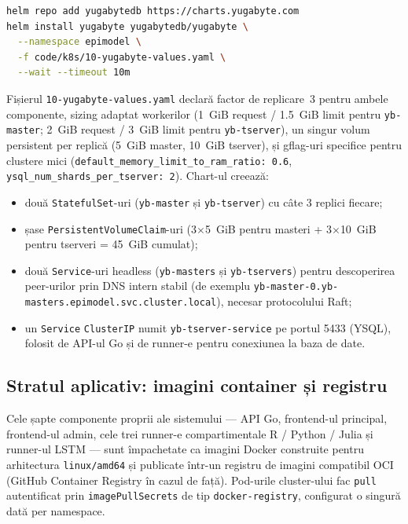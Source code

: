 \begin{lstlisting}[language=bash, caption={Instalarea YugabyteDB cu Helm și fișierul de \texttt{values} custom.}]
helm repo add yugabytedb https://charts.yugabyte.com
helm install yugabyte yugabytedb/yugabyte \
  --namespace epimodel \
  -f code/k8s/10-yugabyte-values.yaml \
  --wait --timeout 10m
\end{lstlisting}

Fișierul \texttt{10-yugabyte-values.yaml} declară factor de replicare~3
pentru ambele componente, sizing adaptat workerilor (1~GiB request /
1.5~GiB limit pentru \texttt{yb-master}; 2~GiB request / 3~GiB limit pentru
\texttt{yb-tserver}), un singur volum persistent per replică
(5~GiB master, 10~GiB tserver), și gflag-uri specifice pentru clustere
mici (\texttt{default\_memory\_limit\_to\_ram\_ratio: 0.6},
\texttt{ysql\_num\_shards\_per\_tserver: 2}). Chart-ul creează:

\begin{itemize}\itemsep0pt
    \item două \texttt{StatefulSet}-uri (\texttt{yb-master} și
          \texttt{yb-tserver}) cu câte 3 replici fiecare;
    \item șase \texttt{PersistentVolumeClaim}-uri (3$\times$5~GiB pentru
          masteri + 3$\times$10~GiB pentru tserveri = 45~GiB cumulat);
    \item două \texttt{Service}-uri headless (\texttt{yb-masters} și
          \texttt{yb-tservers}) pentru descoperirea peer-urilor prin DNS
          intern stabil (de exemplu
          \texttt{yb-master-0.yb-masters.\allowbreak epimodel.svc.cluster.local}),
          necesar protocolului Raft;
    \item un \texttt{Service} \texttt{ClusterIP} numit
          \texttt{yb-tserver-service} pe portul 5433 (YSQL), folosit de
          API-ul Go și de runner-e pentru conexiunea la baza de date.
\end{itemize}

\subsection{Stratul aplicativ: imagini container și registru}
\label{subsec:deploy_aplicatii}

Cele șapte componente proprii ale sistemului --- API Go, frontend-ul principal,
frontend-ul admin, cele trei runner-e compartimentale R / Python / Julia și
runner-ul LSTM --- sunt împachetate ca imagini
Docker construite pentru arhitectura \texttt{linux/amd64} și publicate
într-un registru de imagini compatibil OCI (GitHub Container Registry
în cazul de față). Pod-urile cluster-ului fac \texttt{pull} autentificat
prin \texttt{imagePullSecrets} de tip \texttt{docker-registry}, configurat
o singură dată per namespace.


